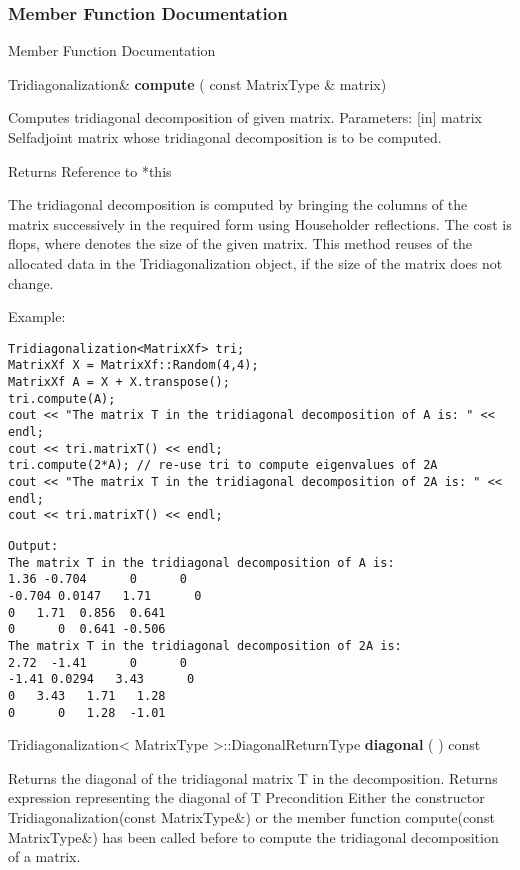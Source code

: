 \subsubsection{Member Function Documentation}
Member Function Documentation


\vspace{0.3cm}
Tridiagonalization\& \textbf{compute}  ( const MatrixType \&  matrix)   

Computes tridiagonal decomposition of given matrix. 
Parameters: 
[in] matrix Selfadjoint matrix whose tridiagonal decomposition is to be computed.  

Returns Reference to *this 

The tridiagonal decomposition is computed by bringing the columns of the matrix successively in the required form using Householder reflections. The cost is  flops, where  denotes the size of the given matrix.
This method reuses of the allocated data in the Tridiagonalization object, if the size of the matrix does not change.


Example:
\begin{lstlisting}
Tridiagonalization<MatrixXf> tri;
MatrixXf X = MatrixXf::Random(4,4);
MatrixXf A = X + X.transpose();
tri.compute(A);
cout << "The matrix T in the tridiagonal decomposition of A is: " << endl;
cout << tri.matrixT() << endl;
tri.compute(2*A); // re-use tri to compute eigenvalues of 2A
cout << "The matrix T in the tridiagonal decomposition of 2A is: " << endl;
cout << tri.matrixT() << endl;
\end{lstlisting}

\begin{verbatim}
Output:
The matrix T in the tridiagonal decomposition of A is: 
1.36 -0.704      0      0
-0.704 0.0147   1.71      0
0   1.71  0.856  0.641
0      0  0.641 -0.506
The matrix T in the tridiagonal decomposition of 2A is: 
2.72  -1.41      0      0
-1.41 0.0294   3.43      0
0   3.43   1.71   1.28
0      0   1.28  -1.01
\end{verbatim}




\vspace{0.3cm}
Tridiagonalization< MatrixType >::DiagonalReturnType \textbf{diagonal}  ( )  const 

Returns the diagonal of the tridiagonal matrix T in the decomposition. 
Returns
expression representing the diagonal of T
Precondition
Either the constructor Tridiagonalization(const MatrixType\&) or the member function compute(const MatrixType\&) has been called before to compute the tridiagonal decomposition of a matrix.


